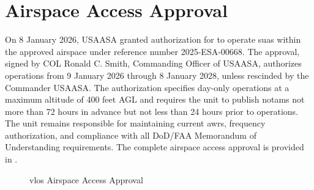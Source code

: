 \section{Airspace Access Approval}\label{sec:airspace-approval}

On 8 January 2026, USAASA granted authorization for \projectmars{} to operate \ac{suas} within the approved airspace under reference number 2025-ESA-00668. The approval, signed by COL Ronald C. Smith, Commanding Officer of USAASA, authorizes operations from 9 January 2026 through 8 January 2028, unless rescinded by the Commander USAASA. The authorization specifies day-only operations at a maximum altitude of 400 feet AGL and requires the unit to publish \ac{notam}s not more than 72 hours in advance but not less than 24 hours prior to operations. The unit remains responsible for maintaining current \ac{awr}s, frequency authorization, and compliance with all DoD/FAA Memorandum of Understanding requirements. The complete airspace access approval is provided in .

\begin{figure}[p]
    \centering
    \caption{\ac{vlos} Airspace Access Approval}
    \label{fig:vlos-approval}
\end{figure}
